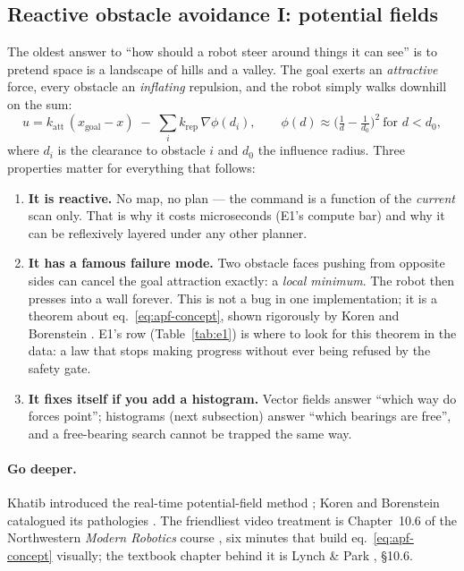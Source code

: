 \subsection{Reactive obstacle avoidance I: potential fields}
\label{sec:concept-apf}

The oldest answer to ``how should a robot steer around things it can see''
is to pretend space is a landscape of hills and a valley. The goal exerts an
\emph{attractive} force, every obstacle an \emph{inflating} repulsion, and
the robot simply walks downhill on the sum:
\begin{equation}
u = k_{\mathrm{att}}\,(x_{\mathrm{goal}} - x)\; -\;
    \sum_{i} k_{\mathrm{rep}}\,\nabla \phi(d_i),
\qquad
\phi(d) \approx \Big(\tfrac{1}{d}-\tfrac{1}{d_0}\Big)^2 \ \text{for } d < d_0,
\label{eq:apf-concept}
\end{equation}
where $d_i$ is the clearance to obstacle $i$ and $d_0$ the influence radius.
Three properties matter for everything that follows:

\begin{enumerate}[leftmargin=1.9em]
\item \textbf{It is reactive.} No map, no plan --- the command is a function
of the \emph{current} scan only. That is why it costs microseconds (E1's
 compute bar) and why it can be reflexively layered under any other
planner.
\item \textbf{It has a famous failure mode.} Two obstacle faces pushing from
opposite sides can cancel the goal attraction exactly: a \emph{local
minimum}. The robot then presses into a wall forever. This is not a bug in
one implementation; it is a theorem about eq.~\eqref{eq:apf-concept}, shown
rigorously by Koren and Borenstein \cite{koren1991}. E1's  row
(Table~\ref{tab:e1}) is where to look for this theorem in the data: a law
that stops making progress without ever being refused by the safety gate.
\item \textbf{It fixes itself if you add a histogram.} Vector fields answer
``which way do forces point''; histograms (next subsection) answer ``which
bearings are free'', and a free-bearing search cannot be trapped the same
way.
\end{enumerate}

\paragraph{Go deeper.} Khatib introduced the real-time potential-field
method \cite{khatib1986}; Koren and Borenstein catalogued its pathologies
\cite{koren1991}. The friendliest video treatment is Chapter~10.6 of the
Northwestern \emph{Modern Robotics} course \cite{lynchvideo}, six minutes
that build eq.~\eqref{eq:apf-concept} visually; the textbook chapter behind
it is Lynch \& Park \cite{lynch2017}, \S10.6.

